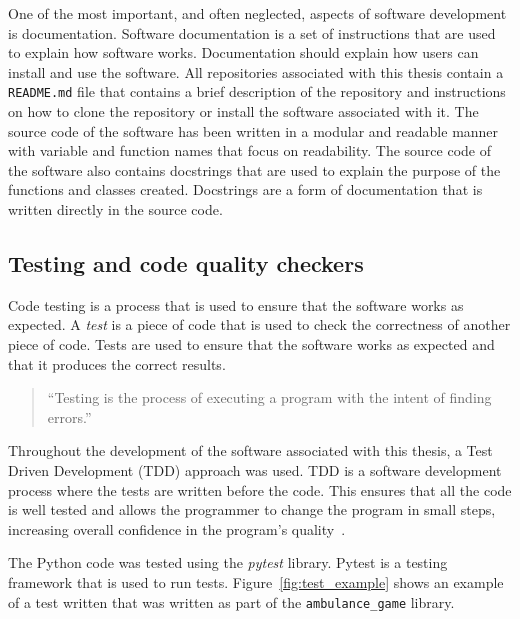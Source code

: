 One of the most important, and often neglected, aspects of software development
is documentation.
Software documentation is a set of instructions that are used to explain how
software works.
Documentation should explain how users can install and use the software.
All repositories associated with this thesis contain a \texttt{README.md} file
that contains a brief description of the repository and instructions on how to
clone the repository or install the software associated with it.
The source code of the software has been written in a modular and readable
manner with variable and function names that focus on readability.
The source code of the software also contains docstrings that are used to
explain the purpose of the functions and classes created.
Docstrings are a form of documentation that is written directly in the source
code.


\subsection{Testing and code quality checkers}

Code testing is a process that is used to ensure that the software works as
expected.
A \textit{test} is a piece of code that is used to check the correctness of
another piece of code.
Tests are used to ensure that the software works as expected and that it
produces the correct results.

\begin{quotation}
    ``Testing is the process of executing a program with the intent of finding
    errors.''~\cite{myers2011art}
\end{quotation}


Throughout the development of the software associated with this thesis, a
Test Driven Development (TDD) approach was used.
TDD is a software development process where the tests are written before the
code.
This ensures that all the code is well tested and allows the programmer to
change the program in small steps, increasing overall confidence in the
program's quality~\cite{astels2003test}.

The Python code was tested using the \textit{pytest} library.
Pytest is a testing framework that is used to run tests.
Figure~\ref{fig:test_example} shows an example of a test written that was
written as part of the \texttt{ambulance\_game} library.

